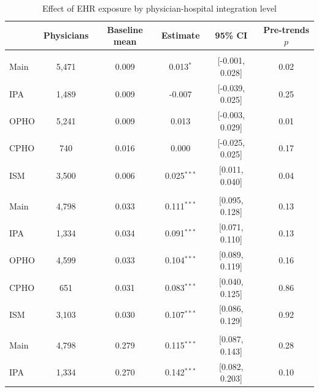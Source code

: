 \begin{table}[!h]
\centering
\caption{\label{tab:het_int}Effect of EHR exposure by physician-hospital integration level}
\centering
\begin{threeparttable}
\begin{tabular}[t]{lccccc}
\toprule
 & Physicians & Baseline mean & Estimate & 95\% CI & Pre-trends $p$\\
\midrule
\addlinespace[0.3em]
\multicolumn{6}{l}{\textbf{Exit}}\\
\hspace{1em}\quad Main & 5,471 & 0.009 & 0.013$^{*}$ & {}[-0.001, 0.028] & 0.02\\
\hspace{1em}\quad IPA & 1,489 & 0.009 & -0.007 & {}[-0.039, 0.025] & 0.25\\
\hspace{1em}\quad OPHO & 5,241 & 0.009 & 0.013 & {}[-0.003, 0.029] & 0.01\\
\hspace{1em}\quad CPHO & 740 & 0.016 & 0.000 & {}[-0.025, 0.025] & 0.17\\
\hspace{1em}\quad ISM & 3,500 & 0.006 & 0.025$^{***}$ & {}[0.011, 0.040] & 0.04\\
\addlinespace[0.3em]
\multicolumn{6}{l}{\textbf{Frac. in Office}}\\
\hspace{1em}\quad Main & 4,798 & 0.033 & 0.111$^{***}$ & {}[0.095, 0.128] & 0.13\\
\hspace{1em}\quad IPA & 1,334 & 0.034 & 0.091$^{***}$ & {}[0.071, 0.110] & 0.13\\
\hspace{1em}\quad OPHO & 4,599 & 0.033 & 0.104$^{***}$ & {}[0.089, 0.119] & 0.16\\
\hspace{1em}\quad CPHO & 651 & 0.031 & 0.083$^{***}$ & {}[0.040, 0.125] & 0.86\\
\hspace{1em}\quad ISM & 3,103 & 0.030 & 0.107$^{***}$ & {}[0.086, 0.129] & 0.92\\
\addlinespace[0.3em]
\multicolumn{6}{l}{\textbf{Work in Office}}\\
\hspace{1em}\quad Main & 4,798 & 0.279 & 0.115$^{***}$ & {}[0.087, 0.143] & 0.28\\
\hspace{1em}\quad IPA & 1,334 & 0.270 & 0.142$^{***}$ & {}[0.082, 0.203] & 0.10\\

\end{tabular}
\end{threeparttable}
\end{table}
